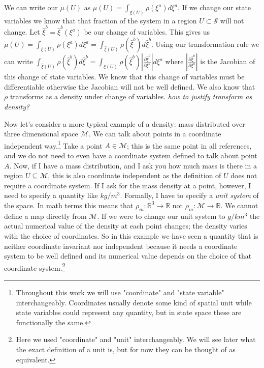 \documentclass{article}
\begin{document}
	We can write our $\mu(U)$ as $\mu(U) = \int_{\xi(U)} \rho(\xi^a)d\xi^a$. If we change our state variables we know that that fraction of the system in a region $U \subset \mathcal{S}$ will not change. Let $\hat{\xi}^b = \hat{\xi}^b(\xi^a)$ be our change of variables. This gives us $\mu(U) = \int_{\xi(U)} \rho(\xi^a)d\xi^a = \int_{\hat{\xi}(U)} \rho(\hat{\xi}^b)d\hat{\xi}^b$. Using our transformation rule we can write $\int_{\hat{\xi}(U)} \rho(\hat{\xi}^b)d\hat{\xi}^b = \int_{\xi(U)} \rho(\hat{\xi}^b)\left|\frac{\partial\hat{\xi}^b}{\partial\xi^a}\right|d\xi^a$ where $\left|\frac{\partial\hat{\xi}^b}{\partial\xi^a}\right|$ is the Jacobian of this change of state variables. We know that this change of variables must be differentiable otherwise the Jacobian will not be well defined. We also know that $\rho$ transforms as a density under change of variables. \emph{how to justify transform as density?}

	Now let's consider a more typical example of a density: mass distributed over three dimensional space $\mathcal{M}$. We can talk about points in a coordinate independent way.\footnote{Throughout this work we will use "coordinate" and "state variable" interchangeably. Coordinates usually denote some kind of spatial unit while state variables could represent any quantity, but in state space these are functionally the same.} Take a point $A \in \mathcal{M}$; this is the same point in all references, and we do not need to even have a coordinate system defined to talk about point $A$. Now, if I have a mass distribution, and I ask you how much mass is there in a region $U \subseteq \mathcal{M}$, this is also coordinate independent as the definition of $U$ does not require a coordinate system. If I ask for the mass density at a point, however, I need to specify a quantity like $kg/m^3$. Formally, I have to specify a \textit{unit system} of the space. In math terms this means that $\rho_m : \mathbb{R}^3 \to \mathbb{R}$ not $\rho_m : \mathcal{M} \to \mathbb{R}$. We cannot define a map directly from $\mathcal{M}$. If we were to change our unit system to $g/km^3$ the actual numerical value of the density at each point changes; the density varies with the choice of coordinates. So in this example we have seen a quantity that is neither coordinate invariant nor independent because it needs a coordinate system to be well defined and its numerical value depends on the choice of that coordinate system.\footnote{Here we used "coordinate" and "unit" interchangeably. We will see later what the exact definition of a unit is, but for now they can be thought of as equivalent.}
	
\end{document}
